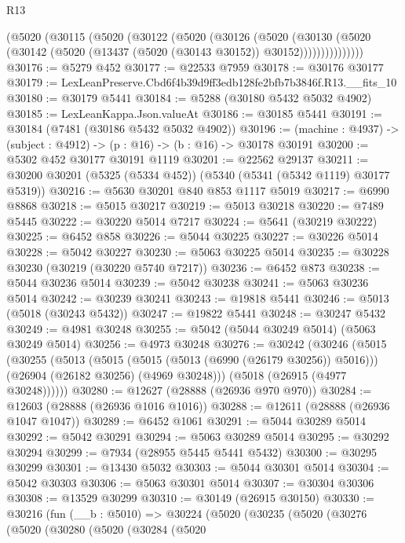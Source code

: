 \begin{lexlean}{R13}
\begin{coremodule}
          (@5020
            (@30115
              (@5020
                (@30122
                  (@5020
                    (@30126
                      (@5020
                        (@30130
                          (@5020
                            (@30142 (@5020 (@13437 (@5020 (@30143 @30152)) @30152)))))))))))))))
@30176 := @5279 @452
@30177 := @22533 @7959
@30178 := @30176 @30177
@30179 := LexLeanPreserve.Cbd6f4b39d9ff3edb128fe2bfb7b3846f.R13.__fits_10
@30180 := @30179 @5441
@30184 := @5288 (@30180 @5432 @5032 @4902)
@30185 := LexLeanKappa.Json.valueAt
@30186 := @30185 @5441
@30191 := @30184 (@7481 (@30186 @5432 @5032 @4902))
@30196 := (machine : @4937) -> (subject : @4912) -> (p : @16) -> (b : @16) -> @30178 @30191
@30200 := @5302 @452 @30177 @30191 @1119
@30201 := @22562 @29137
@30211 := @30200 @30201 (@5325 (@5334 @452)) (@5340 (@5341 (@5342 @1119) @30177 @5319))
@30216 := @5630 @30201 @840 @853 @1117 @5019
@30217 := @6990 @8868
@30218 := @5015 @30217
@30219 := @5013 @30218
@30220 := @7489 @5445
@30222 := @30220 @5014 @7217
@30224 := @5641 (@30219 @30222)
@30225 := @6452 @858
@30226 := @5044 @30225
@30227 := @30226 @5014
@30228 := @5042 @30227
@30230 := @5063 @30225 @5014
@30235 := @30228 @30230 (@30219 (@30220 @5740 @7217))
@30236 := @6452 @873
@30238 := @5044 @30236 @5014
@30239 := @5042 @30238
@30241 := @5063 @30236 @5014
@30242 := @30239 @30241
@30243 := @19818 @5441
@30246 := @5013 (@5018 (@30243 @5432))
@30247 := @19822 @5441
@30248 := @30247 @5432
@30249 := @4981 @30248
@30255 := @5042 (@5044 @30249 @5014) (@5063 @30249 @5014)
@30256 := @4973 @30248
@30276 := @30242
    (@30246
      (@5015
        (@30255
          (@5013
            (@5015 (@5015 (@5013 (@6990 (@26179 @30256)) @5016)))
            (@26904 (@26182 @30256) (@4969 @30248)))
          (@5018 (@26915 (@4977 @30248))))))
@30280 := @12627 (@28888 (@26936 @970 @970))
@30284 := @12603 (@28888 (@26936 @1016 @1016))
@30288 := @12611 (@28888 (@26936 @1047 @1047))
@30289 := @6452 @1061
@30291 := @5044 @30289 @5014
@30292 := @5042 @30291
@30294 := @5063 @30289 @5014
@30295 := @30292 @30294
@30299 := @7934 (@28955 @5445 @5441 @5432)
@30300 := @30295 @30299
@30301 := @13430 @5032
@30303 := @5044 @30301 @5014
@30304 := @5042 @30303
@30306 := @5063 @30301 @5014
@30307 := @30304 @30306
@30308 := @13529 @30299
@30310 := @30149 (@26915 @30150)
@30330 := @30216
    (fun (__b : @5010) =>
    @30224
      (@5020
        (@30235
          (@5020
            (@30276
              (@5020
                (@30280
                  (@5020
                    (@30284
                      (@5020

\end{coremodule}
\end{lexlean}
